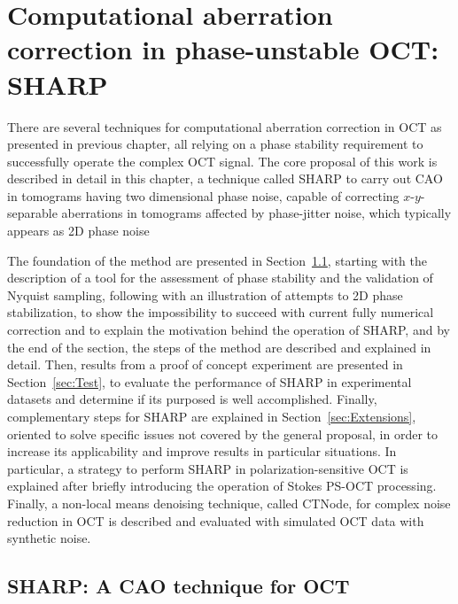 \newpage
{}
\chapter[Computational aberration correction in phase-unstable OCT: SHARP]{Computational aberration correction in phase-unstable OCT: SHARP}\label{chap:SHARP}

There are several techniques for computational aberration correction in OCT as presented in previous chapter, all relying on a phase stability requirement to successfully operate the complex OCT signal. The core proposal of this work is described in detail in this chapter, a technique called SHARP to carry out CAO in tomograms having two dimensional phase noise, capable of correcting $x$-$y$-separable aberrations in tomograms affected by phase-jitter noise, which typically appears as 2D phase noise

The foundation of the method are presented in Section~\ref{sec:SHARP}, starting with the description of a tool for the assessment of phase stability and the validation of Nyquist sampling, following with an illustration of attempts to 2D phase stabilization, to show the impossibility to succeed with current fully numerical correction and to explain the motivation behind the operation of SHARP, and by the end of the section, the steps of the method are described and explained in detail. Then, results from a proof of concept experiment are presented in Section~\ref{sec:Test}, to evaluate the performance of SHARP in experimental datasets and determine if its purposed is well accomplished. Finally, complementary steps for SHARP are explained in Section~\ref{sec:Extensions}, oriented to solve specific issues not covered by the general proposal, in order to increase its applicability and improve results in particular situations. In particular, a strategy to perform SHARP in polarization-sensitive OCT is explained after briefly introducing the operation of Stokes PS-OCT processing. Finally, a non-local means denoising technique, called CTNode, for complex noise reduction in OCT is described and evaluated with simulated OCT data with synthetic noise.

\section{SHARP: A CAO technique for OCT}\label{sec:SHARP}

